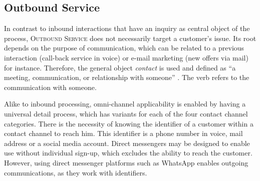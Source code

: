 	 
	 
	 
	 
	 
	 
	 \subsection{Outbound Service}
	 	 \label{pr:out}
	 In contrast to inbound interactions that have an inquiry as central object of the process, \textsc{Outbound Service} does not necessarily target a customer's issue. Its root depends on the purpose of communication, which can be related to a previous interaction (call-back service in voice) or e-mail marketing (new offers via mail) for instance. Therefore, the general object \textit{contact} is used and defined as \enquote{a meeting, communication, or relationship with someone} \citep{oxfordcontact}. The verb refers to the communication with someone.
	 
	 Alike to inbound processing, omni-channel applicability is enabled by having a universal detail process, which has variants for each of the four contact channel categories. There is the necessity of knowing the identifier of a customer within a contact channel to reach him. This identifier is a phone number in voice, mail address or a social media account. Direct messengers may be designed to enable use without individual sign-up, which excludes the ability to reach the customer. However, using direct messenger platforms such as WhatsApp enables outgoing communications, as they work with identifiers. 
	 
